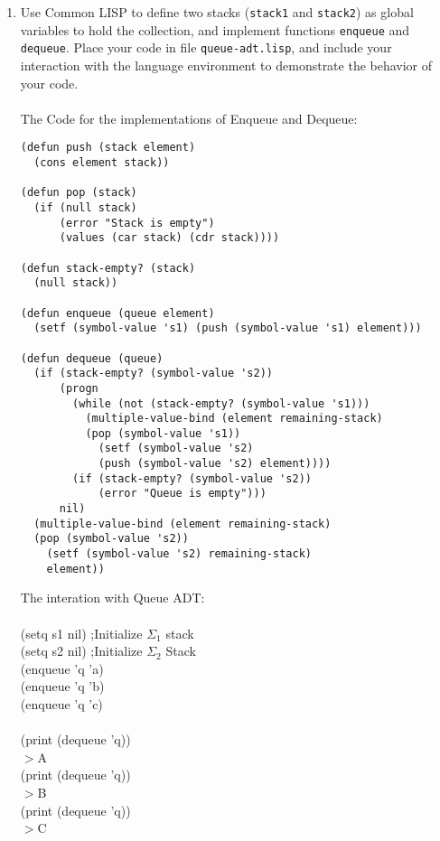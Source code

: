\begin{enumerate}
\begin{itemize}
\begin{lstlisting}[mathscape]
            dequeue(Q)
                if (isEmpty((*$\Sigma_{1}$*)) && isEmpty((*$\Sigma_{2}$*)) )
                    nil
                if (isEmpty((*$\Sigma_{2}$*)))
                    while(not(isEmpty((*$\Sigma_{1}$*))))
                        push((*$\Sigma_{2}$*), pop((*$\Sigma_{1}$*)))
                return pop(((*$\Sigma_{2}$*)))
        \end{lstlisting}
    \end{itemize}



    \item Use Common LISP to define two stacks (\texttt{stack1} and
\texttt{stack2}) as global variables to hold the collection, and implement functions \texttt{enqueue}
and \texttt{dequeue}. Place your code in file \texttt{queue-adt.lisp}, and include your interaction
with the language environment to demonstrate the behavior of your code.\\ \\
The Code for the implementations of Enqueue and Dequeue: 
\begin{lstlisting}
(defun push (stack element)
  (cons element stack))

(defun pop (stack)
  (if (null stack)
      (error "Stack is empty")
      (values (car stack) (cdr stack))))

(defun stack-empty? (stack)
  (null stack))

(defun enqueue (queue element)
  (setf (symbol-value 's1) (push (symbol-value 's1) element)))

(defun dequeue (queue)
  (if (stack-empty? (symbol-value 's2))
      (progn
        (while (not (stack-empty? (symbol-value 's1)))
          (multiple-value-bind (element remaining-stack) 
          (pop (symbol-value 's1))
            (setf (symbol-value 's2) 
            (push (symbol-value 's2) element))))
        (if (stack-empty? (symbol-value 's2))
            (error "Queue is empty")))
      nil)
  (multiple-value-bind (element remaining-stack) 
  (pop (symbol-value 's2))
    (setf (symbol-value 's2) remaining-stack)
    element))
\end{lstlisting}
\newpage
The interation with Queue ADT: \\ \\ 

(setq s1 nil) ;Initialize $\Sigma_1$ stack \\
(setq s2 nil) ;Initialize $\Sigma_2$ Stack \\

(enqueue 'q 'a)\\
(enqueue 'q 'b)\\
(enqueue 'q 'c)\\\\
(print (dequeue 'q))\\
$\mathbb{>}$A\\
(print (dequeue 'q))\\
$\mathbb{>}$B\\
(print (dequeue 'q))\\
$\mathbb{>}$C\\


\end{enumerate}
